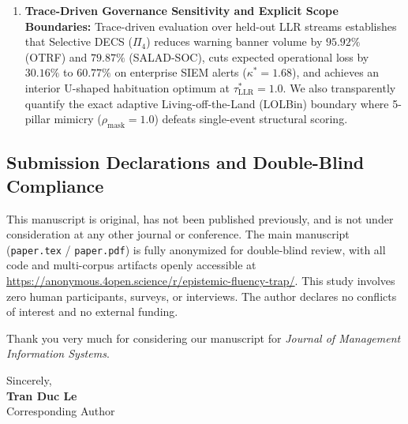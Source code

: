 \documentclass[11pt,a4paper]{article}
\begin{document}
\begin{enumerate}
  \item \textbf{Trace-Driven Governance Sensitivity and Explicit Scope Boundaries:} Trace-driven evaluation over held-out LLR streams establishes that Selective DECS ($\Pi_4$) reduces warning banner volume by $95.92\%$ (OTRF) and $79.87\%$ (SALAD-SOC), cuts expected operational loss by $30.16\%$ to $60.77\%$ on enterprise SIEM alerts ($\kappa^* = 1.68$), and achieves an interior U-shaped habituation optimum at $\tau^*_{\text{LLR}} = 1.0$. We also transparently quantify the exact adaptive Living-off-the-Land (LOLBin) boundary where 5-pillar mimicry ($\rho_{\text{mask}} = 1.0$) defeats single-event structural scoring.
\end{enumerate}

\subsection*{Submission Declarations and Double-Blind Compliance}
This manuscript is original, has not been published previously, and is not under consideration at any other journal or conference. The main manuscript (\texttt{paper.tex} / \texttt{paper.pdf}) is fully anonymized for double-blind review, with all code and multi-corpus artifacts openly accessible at \url{https://anonymous.4open.science/r/epistemic-fluency-trap/}. This study involves zero human participants, surveys, or interviews. The author declares no conflicts of interest and no external funding.

\medskip
Thank you very much for considering our manuscript for \textit{Journal of Management Information Systems}.

\bigskip
\noindent Sincerely,\\[0.5em]
\textbf{Tran Duc Le}\\
Corresponding Author
\end{document}
